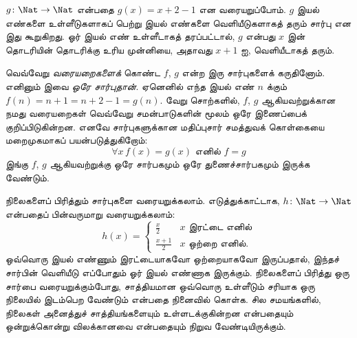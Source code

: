 \documentclass[../../../include/open-logic-section]{subfiles}
\begin{document}
\begin{ex}
$g \colon \Nat \to \Nat$ என்பதை $g(x) = x+2-1$ என வரையறுப்போம்.
$g$ இயல் எண்களை உள்ளீடுகளாகப் பெற்று இயல் எண்களை வெளியீடுகளாகத் தரும்
சார்பு என இது கூறுகிறது. ஓர் இயல் எண் உள்ளீடாகத் தரப்பட்டால், $g$ என்பது
$x$ இன் தொடரியின் தொடரிக்கு உரிய முன்னியை, அதாவது $x+1$ ஐ,
வெளியீடாகத் தரும்.
\end{ex}

\begin{explain}
வெவ்வேறு \emph{வரையறைகளைக்} கொண்ட $f$, $g$ என்ற இரு சார்புகளைக்
கருதினோம். எனினும் இவை \emph{ஒரே சார்புதான்}.
ஏனெனில் எந்த இயல் எண் $n$ க்கும் $f(n) = n+1 = n+2-1 =
g(n)$. வேறு சொற்களில், $f$, $g$ ஆகியவற்றுக்கான நமது வரையறைகள்
வெவ்வேறு சமன்பாடுகளின் மூலம் ஒரே இணைப்பைக் குறிப்பிடுகின்றன.
எனவே சார்புகளுக்கான மதிப்புசார் சமத்துவக் கொள்கையை மறைமுகமாகப்
பயன்படுத்துகிறோம்:
\[
  \forall x\, f(x) = g(x)\text{ எனில் }f = g
\]
இங்கு $f$, $g$ ஆகியவற்றுக்கு ஒரே சார்பகமும் ஒரே துணைச்சார்பகமும்
இருக்க வேண்டும்.
\end{explain}

\begin{ex}
நிலைகளைப் பிரித்தும் சார்புகளை வரையறுக்கலாம். எடுத்துக்காட்டாக,
$h \colon \Nat \to \Nat$ என்பதைப் பின்வருமாறு வரையறுக்கலாம்:
\[
h(x) =
\begin{cases}
  \frac{x}{2} & \text{$x$ இரட்டை எனில்} \\
  \frac{x+1}{2} & \text{$x$ ஒற்றை எனில்.}
\end{cases}
\]
ஒவ்வொரு இயல் எண்ணும் இரட்டையாகவோ ஒற்றையாகவோ இருப்பதால், இந்தச்
சார்பின் வெளியீடு எப்போதும் ஓர் இயல் எண்ணாக இருக்கும்.
நிலைகளைப் பிரித்து ஒரு சார்பை வரையறுக்கும்போது, சாத்தியமான ஒவ்வொரு
உள்ளீடும் சரியாக ஒரு நிலையில் இடம்பெற வேண்டும் என்பதை நினைவில் கொள்க.
சில சமயங்களில், நிலைகள் அனைத்துச் சாத்தியங்களையும் உள்ளடக்குகின்றன
என்பதையும் ஒன்றுக்கொன்று விலக்கானவை என்பதையும் நிறுவ வேண்டியிருக்கும்.
\end{ex}
\end{document}

